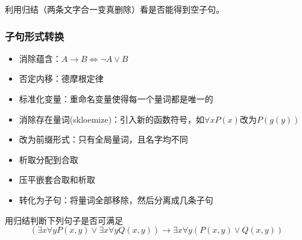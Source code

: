 利用归结（两条文字合一变真删除）看是否能得到空子句。

\subsubsection{子句形式转换}
\begin{itemize}
	\item 消除蕴含：$A\to B\iff \lnot A\lor B$
	\item 否定内移：德摩根定律
	\item 标准化变量：重命名变量使得每一个量词都是唯一的
	\item 消除存在量词(skloemize)：引入新的函数符号，如$\forall x P(x)$改为$P(g(y))$
	\item 改为前缀形式：只有全局量词，且名字均不同
	\item 析取分配到合取
	\item 压平嵌套合取和析取
	\item 转化为子句：将量词全部移除，然后分离成几条子句
\end{itemize}
\begin{example} %
用归结判断下列句子是否可满足
\[(\exists x\forall y P(x,y)\lor\exists x\forall y Q(x,y))\to
\exists x\forall y(P(x,y)\lor Q(x,y))\]
\end{example}
